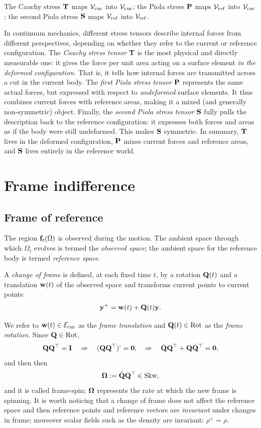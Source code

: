 The Cauchy stress $\mathbf{T}$ maps $\operatorname{\mathcal{V}_{\textrm cur}}$ into $\operatorname{\mathcal{V}_{\textrm cur}}$; the Piola stress $\mathbf{P}$ maps $\operatorname{\mathcal{V}_{\textrm ref}}$ into $\operatorname{\mathcal{V}_{\textrm cur}}$; the second Piola stress $\mathbf{S}$ maps $\operatorname{\mathcal{V}_{\textrm ref}}$ into $\operatorname{\mathcal{V}_{\textrm ref}}$.


In continuum mechanics, different stress tensors describe internal forces from different perspectives, depending on whether they refer to the current or reference configuration. The \emph{Cauchy stress tensor} $\mathbf{T}$ is the most physical and directly measurable one: it gives the force per unit area acting on a surface element \emph{in the deformed configuration}. That is, it tells how internal forces are transmitted across a cut in the current body. The \emph{first Piola stress tensor} \(\mathbf{P} \) represents the same actual forces, but expressed with respect to \emph{undeformed} surface elements. It thus combines current forces with reference areas, making it a mixed (and generally non-symmetric) object. Finally, the \emph{second Piola stress tensor} \( \mathbf{S} \) fully pulls the description back to the reference configuration: it expresses both forces and areas as if the body were still undeformed. This makes \(\mathbf{S} \) symmetric. In summary, \( \mathbf{T} \) lives in the deformed configuration, \(\mathbf{P}\) mixes current forces and reference areas, and \(\mathbf{S}\) lives entirely in the reference world.




\chapter{Frame indifference}\label{FI}
\section{Frame of reference}
The region $\mathbf{f}_t(\Omega)$ is observed during the motion. The ambient space through which $\Omega_t$ evolves is termed the \textit{observed space}; the ambient space for the reference body is termed \textit{reference space}.

A \textit{change of frame} is defined, at each fixed time $t$, by a rotation $\mathbf{Q}(t)$ and a translation $\mathbf{w}(t)$ of the observed space and transforms current points to current points:
\begin{equation}\label{y+}
	\mathbf{y}^+=\mathbf{w}(t)+\mathbf{Q}(t)\mathbf{y}.
\end{equation}

We refer to $\mathbf{w}(t)\in\operatorname{\mathcal{E}_{\textrm cur}}$ as the \textit{frame translation} and $\mathbf{Q}(t)\in\operatorname{Rot}$ as the \textit{frame rotation}. Since $\mathbf{Q}\in\operatorname{Rot}$,
\begin{equation}
	\mathbf{Q}\mathbf{Q}^\top=\mathbf{I} \quad \Rightarrow\quad (\mathbf{Q}\mathbf{Q}^\top)^{\operatorname{{\boldsymbol{\cdot}}}}=\mathbf{0}, \quad \Rightarrow\quad \dot{\mathbf{Q}}\mathbf{Q}^\top+\mathbf{Q}\dot{\mathbf{Q}}^\top=\mathbf{0},
\end{equation}
and then then
\begin{equation}
	\bm{\Omega}:=\dot{\mathbf{Q}}\mathbf{Q}^\top\in\operatorname{Skw},
\end{equation}
and it is called frame-spin; $\bm{\Omega}$ represents  the rate at which the new frame is spinning. It is worth noticing that a change of frame does not affect the reference space and then reference points and reference vectors are \textit{invariant} under changes in frame; moreover scalar fields such as the density are invariant: $\rho^+=\rho$.

